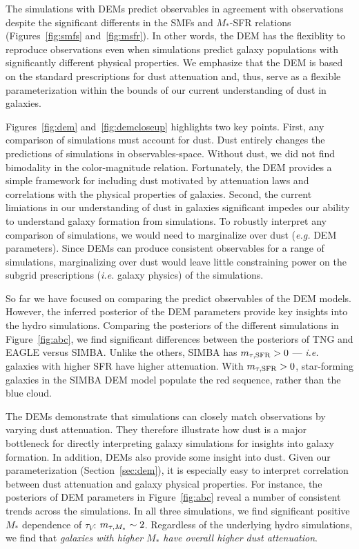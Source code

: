 The simulations with DEMs predict observables in agreement with observations 
despite the significant differents in the SMFs and $M_*$-SFR relations 
(Figures~\ref{fig:smfs} and~\ref{fig:msfr}). In other words, the DEM has the 
flexiblity to reproduce observations even when simulations predict galaxy
populations with significantly different physical properties. We emphasize that
the DEM is based on the standard prescriptions for dust attenuation and, thus,
serve as a flexible parameterization within the bounds of our current
understanding of dust in galaxies.

Figures~\ref{fig:dem} and~\ref{fig:demcloseup} highlights two key points. First, any comparison of
simulations must account for dust. Dust entirely changes the predictions of
simulations in observables-space. Without dust, we did not find bimodality in
the color-magnitude relation.
Fortunately, the DEM provides a simple framework
for including dust motivated by attenuation laws and correlations with the
physical properties of galaxies. 
Second, the current limiations in our understanding of dust in galaxies 
significant impedes our ability to understand galaxy formation from simulations. 
To robustly interpret any comparison of simulations, we would need to
marginalize over dust (\emph{e.g.} DEM parameters). Since DEMs can produce
consistent observables for a range of simulations, marginalizing over dust
would leave little constraining power on the subgrid prescriptions (\emph{i.e.}
galaxy physics) of the simulations. 

So far we have focused on comparing the predict observables of the DEM models.
However, the inferred posterior of the DEM parameters provide key insights into 
the hydro simulations. Comparing the posteriors of the different simulations in
Figure~\ref{fig:abc}, we find significant differences between the posteriors of TNG and EAGLE versus
SIMBA. Unlike the others, SIMBA has $m_{\tau,{\rm SFR}} > 0$ --- \emph{i.e.} galaxies with higher SFR
have higher attenuation. With $m_{\tau,{\rm SFR}} > 0$, star-forming galaxies in the SIMBA
DEM model populate the red sequence, rather than the blue cloud.  

The DEMs demonstrate that simulations can closely match observations by varying
dust attenuation. They therefore illustrate how dust is a major bottleneck for
directly interpreting galaxy simulations for insights into galaxy formation. In
addition, DEMs also provide some insight into dust. Given our parameterization
(Section~\ref{sec:dem}), it is especially easy to interpret correlation between
dust attenuation and galaxy physical properties. For instance, the posteriors of
DEM parameters in Figure~\ref{fig:abc} reveal a
number of consistent trends across the simulations. In all three simulations, we find significant positive
$M_*$ dependence of $\tau_V$: $m_{\tau,M_*} \sim 2$. Regardless of the underlying
hydro simulations, we find that {\em galaxies with higher $M_*$ have overall higher 
dust attenuation}.

